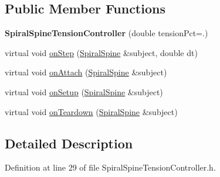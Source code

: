 \subsection*{Public Member Functions}
\begin{DoxyCompactItemize}
\item 
\hypertarget{class_spiral_spine_tension_controller_a599e317f897d1f57a75fab7e00839a25}{{\bfseries Spiral\-Spine\-Tension\-Controller} (double tension\-Pct=.)}\label{class_spiral_spine_tension_controller_a599e317f897d1f57a75fab7e00839a25}

\item 
virtual void \hyperlink{class_spiral_spine_tension_controller_adba84042917c4c0a51cf94e2fef6634a}{on\-Step} (\hyperlink{class_spiral_spine}{Spiral\-Spine} \&subject, double dt)
\item 
virtual void \hyperlink{classtg_observer_a0ecd07483eb41f9a0ab19b8ed24052f1}{on\-Attach} (\hyperlink{class_spiral_spine}{Spiral\-Spine} \&subject)
\item 
virtual void \hyperlink{classtg_observer_ae7b2de87bd4a6e786bc16f1b801c36a6}{on\-Setup} (\hyperlink{class_spiral_spine}{Spiral\-Spine} \&subject)
\item 
virtual void \hyperlink{classtg_observer_a1663edb3732e5ffb7bbe6bfb4ade88b8}{on\-Teardown} (\hyperlink{class_spiral_spine}{Spiral\-Spine} \&subject)
\end{DoxyCompactItemize}


\subsection{Detailed Description}


Definition at line 29 of file Spiral\-Spine\-Tension\-Controller.\-h.



